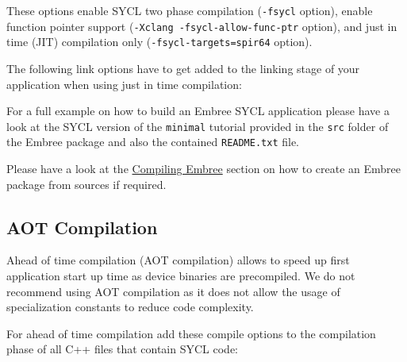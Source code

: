These options enable SYCL two phase compilation (\texttt{-fsycl}
option), enable function pointer support
(\texttt{-Xclang\ -fsycl-allow-func-ptr} option), and just in time (JIT)
compilation only (\texttt{-fsycl-targets=spir64} option).

The following link options have to get added to the linking stage of
your application when using just in time compilation:

\begin{Shaded}
\begin{Highlighting}[]
\OperatorTok{{-}}\OperatorTok{{-}}\OperatorTok{{-}}\OperatorTok{=}
\end{Highlighting}
\end{Shaded}

For a full example on how to build an Embree SYCL application please
have a look at the SYCL version of the \texttt{minimal} tutorial
provided in the \texttt{src} folder of the Embree package and also the
contained \texttt{README.txt} file.

Please have a look at the \hyperref[compiling-embree]{Compiling Embree}
section on how to create an Embree package from sources if required.

\subsection{AOT Compilation}\label{aot-compilation}

Ahead of time compilation (AOT compilation) allows to speed up first
application start up time as device binaries are precompiled. We do not
recommend using AOT compilation as it does not allow the usage of
specialization constants to reduce code complexity.

For ahead of time compilation add these compile options to the
compilation phase of all C++ files that contain SYCL code:

\begin{Shaded}
\begin{Highlighting}[]
\OperatorTok{{-}}\OperatorTok{{-}}\OperatorTok{{-}}\OperatorTok{{-}}\OperatorTok{{-}}\OperatorTok{{-}}\OperatorTok{{-}}\OperatorTok{{-}}\OperatorTok{=}
\end{Highlighting}
\end{Shaded}

